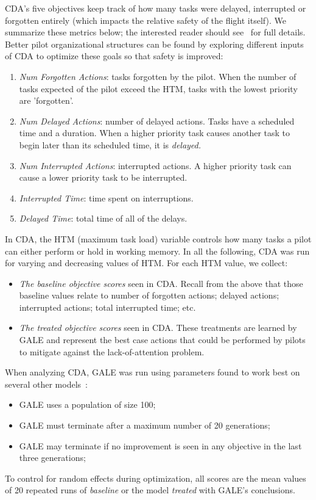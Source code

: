 \documentclass[journal]{IEEEtran}
\newcommand{\bi}{\begin{itemize}}
\newcommand{\ei}{\end{itemize}}
\newcommand{\be}{\begin{enumerate}}
\newcommand{\ee}{\end{enumerate}}
\newenvironment{changed}{\par}{\par}
\begin{document}
CDA's five objectives  keep track of how many tasks were delayed, interrupted or forgotten entirely (which impacts the relative safety of the flight itself).  
We summarize these metrics below; the interested reader should see~\cite{Kim2011} for full details. 
Better pilot organizational structures can be found by exploring different inputs of CDA to optimize these goals so that safety is improved:
\begin{changed}
\be
\item \emph{Num Forgotten Actions}: tasks forgotten by the pilot. When the number of tasks expected of the pilot exceed the HTM, tasks with the lowest priority are 'forgotten'.
\item {\em Num Delayed Actions}: number of delayed actions. Tasks have a scheduled time and a duration.  When a higher priority task causes another task to begin later than its scheduled time, it is \em{delayed}.
\item  \emph{Num Interrupted Actions}: interrupted actions. A higher priority task can cause a lower priority task to be interrupted.
\item  {\em Interrupted Time}: time spent on  interruptions.
\item \emph{Delayed Time}: total time of all of the delays.
\ee
\end{changed}

In CDA, the HTM (maximum task load) variable controls how many tasks a pilot can either perform or hold in working memory.
In all the following, CDA was run for varying and decreasing values of HTM.
For each HTM value, we collect:
\bi
\item {\em The  baseline objective scores} seen in CDA. Recall from the above that those baseline values relate to number of
forgotten actions; delayed actions; interrupted actions;
total interrupted time; etc.
\item {\em The treated objective scores} seen in CDA. These treatments are learned
by GALE and represent the best case actions that could be performed by pilots
to mitigate against the lack-of-attention problem.
\ei

When analyzing CDA, GALE was run using  parameters found to work best on several other models~\cite{krallphd}:
\bi
\item GALE uses a population of size 100;
\item GALE must  terminate after a maximum number of 20 generations;
\item GALE may terminate if no improvement is seen in any objective in the last three generations;
\ei
To control for random effects during optimization, all scores are the mean values of 20 repeated runs of {\em baseline} or  the model {\em treated} with GALE's conclusions.
\end{document}
